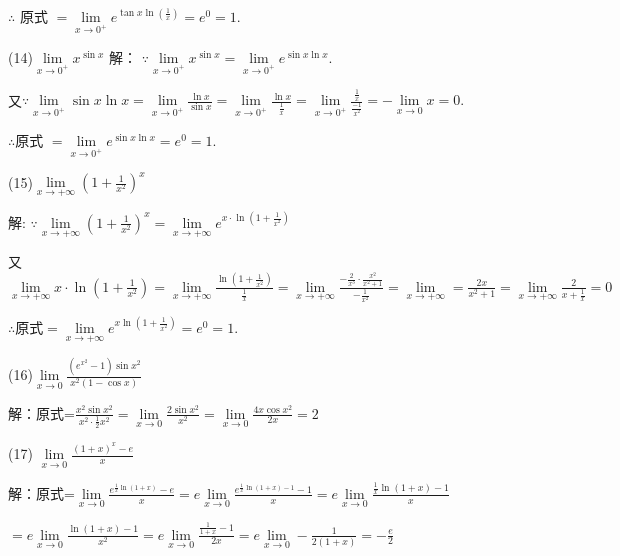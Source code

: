 \documentclass{article}
\begin{document}
\begin{enumerate}[1.]
				$\therefore$ 原式 $=\lim\limits _{x \rightarrow 0^{+}} e^{\tan x \ln \left(\frac{1}{x}\right)}=e^{0}=1$.
				
				(14)$\lim\limits _{x \rightarrow 0^{+}} x^{\sin x}$
				解： $\because \lim\limits _{x \rightarrow 0^{+}} x^{\sin x}=\lim\limits _{x \rightarrow 0^{+}} e^{\sin x \ln x}$.
				
				又$ \because \lim\limits _{x \rightarrow 0^{+}} \sin x \ln x
				=\lim\limits _{x \rightarrow 0^{+}} \frac{\ln x}{\sin x}
				=\lim\limits_{x \rightarrow 0^{+}} \frac{\ln x}{\frac{1}{x}}
				=\lim\limits _{x \rightarrow 0^{+}} \frac{\frac{1}{x}}{\frac{-1}{x^{2}}}
				=-\lim\limits _{x \rightarrow 0} x=0.$
				
				$\therefore$原式 $=\lim\limits _{x \rightarrow 0^{+}} e^{\sin x \ln x}=e^{0}=1$.
				
				(15)$\lim\limits _{x \rightarrow+\infty}\left(1+\frac{1}{x^{2}}\right)^{x}$
				
				解: $\because \lim\limits_{x \rightarrow+\infty}\left(1+\frac{1}{x^{2}}\right)^{x}
				=\lim\limits_{x \rightarrow+\infty} e^{x \cdot \ln \left(1+\frac{1}{x^{2}}\right)}$
				
				又$\lim\limits_{x \rightarrow+\infty} x \cdot \ln \left(1+\frac{1}{x^{2}}\right)
				=\lim\limits_{x \rightarrow+\infty} \frac{\ln \left(1+\frac{1}{x^{2}}\right)}{\frac{1}{x}}
				=\lim\limits_{x \rightarrow+\infty} \frac{-\frac{2}{x^{3}} \cdot \frac{x^{2}}{x^{2}+1}}{-\frac{1}{x^{2}}}
				=\lim\limits_{x \rightarrow+\infty}
				=\frac{2 x}{x^{2}+1}
				=\lim\limits_{x \rightarrow+\infty} \frac{2}{x+\frac{1}{x}}=0$
				
				$\therefore$原式$=\lim\limits_{x \rightarrow+\infty} e^{x \ln \left(1+\frac{1}{x^{2}}\right)}=e^{0}=1$.
				
				(16)$\lim\limits_{x\rightarrow 0}\frac{(e^{x^2}-1)\sin x^2}{x^2(1-\cos x)}$
				
				解：原式=$\frac{x^2\sin x^2}{x^2\cdot \frac{1}{2}x^2}
				=\lim\limits_{x\rightarrow 0}\frac{2\sin x^2}{x^2}
				=\lim\limits_{x\rightarrow 0}\frac{4x\cos x^2}{2x}=2$
				
				(17) $\lim\limits _{x \rightarrow 0} \frac{(1+x)^{x}-e}{x}$
				
				解：原式=$\lim\limits_{x\rightarrow 0}\frac{e^{\frac{1}{x}\ln (1+x)}-e}{x}
				=e\lim\limits_{x\rightarrow 0}\frac{e^{\frac{1}{x}\ln (1+x)-1}-1}{x}
				=e\lim\limits_{x\rightarrow 0}\frac{\frac{1}{x}\ln (1+x)-1}{x}$
				
				$=e\lim\limits_{x\rightarrow 0}\frac{\ln (1+x)-1}{x^2}
				=e\lim\limits_{x\rightarrow 0}\frac{\frac{1}{1+x}-1}{2x}
				=e\lim\limits_{x\rightarrow 0}-\frac{1}{2(1+x)}=-\frac{e}{2}$
				

\end{enumerate}
\end{document}
